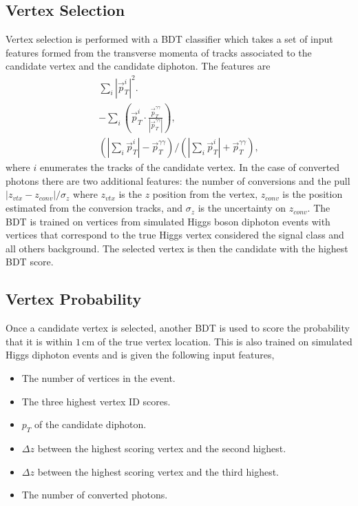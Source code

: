 \subsection{Vertex Selection}
Vertex selection is performed with a BDT classifier which takes a set of input features formed from the transverse momenta of tracks associated to the candidate vertex and the candidate diphoton. The features are
\begin{gather*}
    \sum_{i}|\vec{p}_{T}^{i}|^{2}. \\
    -\sum_{i}(\vec{p}_{T}^{i}\cdot\frac{\vec{p}_{T}^{\gamma\gamma}}{|\vec{p}_{T}^{\gamma\gamma}|}), \\
    (|\sum_{i}\vec{p}_{T}^{i}|-\vec{p}_{T}^{\gamma\gamma})/(|\sum_{i}\vec{p}_{T}^{i}|+\vec{p}_{T}^{\gamma\gamma}),
\end{gather*}
where $i$ enumerates the tracks of the candidate vertex. In the case of converted photons there are two additional features: the number of conversions and the pull $|z_{vtx} - z_{conv}|/\sigma_{z}$ where $z_{vtx}$ is the $z$ position from the vertex, $z_{conv}$ is the position estimated from the conversion tracks, and $\sigma_z$ is the uncertainty on $z_{conv}$.
The BDT is trained on vertices from simulated Higgs boson diphoton events with vertices that correspond to the true Higgs vertex considered the signal class and all others background. The selected vertex is then the candidate with the highest BDT score. 


\subsection{Vertex Probability}
Once a candidate vertex is selected, another BDT is used to score the probability that it is within $1$\,cm of the true vertex location.   
This is also trained on simulated Higgs diphoton events and is given the following input features,
\begin{itemize}[noitemsep]
    \item The number of vertices in the event.
    \item The three highest vertex ID scores.
    \item $p_{T}$ of the candidate diphoton.
    \item $\Delta{z}$ between the highest scoring vertex and the second highest.
    \item $\Delta{z}$ between the highest scoring vertex and the third highest.
    \item The number of converted photons.
\end{itemize}


